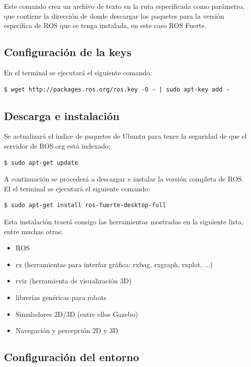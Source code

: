 \documentclass[12pt, a4paper]{report}
\begin{document}
Este comando crea un archivo de texto en la ruta especificada como parámetro, que contiene la dirección de donde descargar los paquetes para la versión específica de ROS que se tenga instalada, en este caso ROS Fuerte.

\subsection{Configuración de la keys}

En el terminal se ejecutará el siguiente comando:

\begin{verbatim}
$ wget http://packages.ros.org/ros.key -O - | sudo apt-key add -
\end{verbatim}

\subsection{Descarga e instalación}

Se actualizará el índice de paquetes de Ubuntu para tener la seguridad de que el servidor de ROS.org está indexado:

\begin{verbatim}
$ sudo apt-get update
\end{verbatim}

A continuación se procederá a descargar e instalar la versión completa de ROS. El el terminal se ejecutará el siguiente comando:

\begin{verbatim}
$ sudo apt-get install ros-fuerte-desktop-full
\end{verbatim}

Esta instalación traerá consigo las herramientas mostradas en la siguiente lista, entre muchas otras:

\begin{itemize}
\item ROS
\item rx (herramientas para interfaz gráfica: rxbag,  rxgraph, rxplot, ...)
\item rviz (herramienta de visualización 3D)
\item librerías genéricas para robots
\item Simuladores 2D/3D (entre ellos Gazebo)
\item Navegación y percepción 2D y 3D
\end{itemize}

\subsection{Configuración del entorno}
\end{document}
